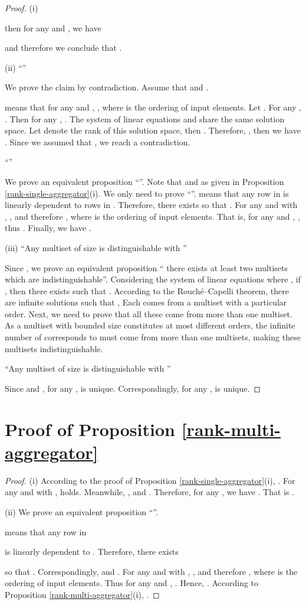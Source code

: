 \documentclass{article} \usepackage{iclr2021_conference,times}
\begin{document}
\begin{proof}
(i)

then for any  and , we have 

and therefore we conclude that .

(ii)
``''

We prove the claim by contradiction.
Assume that  and .

means that for any  and ,
,
where  is the ordering of input elements.
Let .
For any ,
.
Then for any , .
The system of linear equations  and  share the same solution space.
Let  denote the rank of this solution space,
then .
Therefore, ,
then we have .
Since we assumed that ,
we reach a contradiction.

``''

We prove an equivalent proposition ``''.
Note that  and  as given in Proposition \ref{rank-single-aggregator}(i).
We only need to prove ``''.
 means that any row in  is linearly dependent to rows in .
Therefore, there exists  so that .
For any  and  with ,
,
and therefore
,
where  is the ordering of input elements.
That is,
for any  and ,
,
thus
.
Finally, we have .

(iii)
``Any multiset of size  is distinguishable with ''

Since ,
we prove an equivalent proposition `` there exists at least two multisets which are indistinguishable''.
Considering the system of linear equations  where ,
if ,
then there exists  such that .
According to the Rouché–Capelli theorem, there are infinite solutions  such that ,
Each  comes from a multiset with a particular order.
Next, we need to prove that all these  come from more than one multiset.
As a multiset with bounded size  constitutes at most  different orders, the infinite number of  corresponds to  must come from more than one multisets, making these multisets indistinguishable.

``Any multiset of size  is distinguishable with ''

Since  and , for any ,
 is unique.
Correspondingly,
for any ,
 is unique.

\end{proof}

\section{Proof of Proposition \ref{rank-multi-aggregator}}
\label{proof-rank-multi-aggregator}

\begin{proof}
(i)
According to the proof of Proposition \ref{rank-single-aggregator}(i),
.
For any  and  with ,
 holds.
Meanwhile,
,
and .
Therefore, for any ,
we have .
That is .

(ii)
We prove an equivalent proposition
``''.

means that any row in

is linearly dependent to
.
Therefore, there exists

so that
.
Correspondingly,
 and .
For any  and  with ,
,
and therefore
,
where  is the ordering of input elements.
Thus for any  and ,
.
Hence,
.
According to Proposition \ref{rank-multi-aggregator}(i), .
\end{proof}
\end{document}
